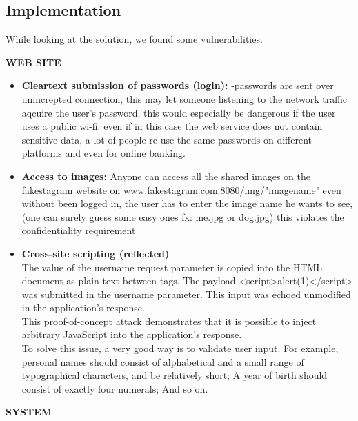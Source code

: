 \subsection{Implementation}

While looking at the solution, we found some vulnerabilities. \\

\begin{center}
\textbf{WEB SITE}
\end{center}
\begin{itemize}  
\item \textbf{Cleartext submission of passwords (login):}
-passwords are sent over unincrepted connection, this may let someone listening to the network traffic aqcuire the user's password.
this would especially be dangerous if the user uses a public wi-fi.
even if in this case the web service does not contain sensitive data, a lot of people re use the same passwords on different platforms and even for online banking.

\item \textbf{Access to images:}
Anyone can access all the shared images on the fakestagram website on www.fakestagram.com:8080/img/"imagename" even without been logged in, the user has to enter the image name he wants to see,(one can surely guess some easy ones fx: me.jpg or dog.jpg)
this violates the confidentiality requirement


\item \textbf{Cross-site scripting (reflected)} \\

The value of the username request parameter is copied into the HTML document as plain text between tags. The payload <script>alert(1)</script> was submitted in the username parameter. This input was echoed unmodified in the application's response. \\

This proof-of-concept attack demonstrates that it is possible to inject arbitrary JavaScript into the application's response. \\

To solve this issue, a very good way is to validate user input. For example, personal names should consist of alphabetical and a small range of typographical characters, and be relatively short; A year of birth should consist of exactly four numerals; And so on.

\end{itemize}

\begin{center}
\textbf{SYSTEM}
\end{center}

